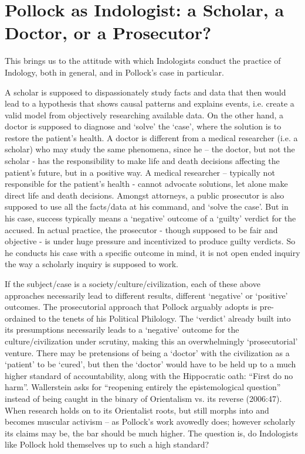 \section*{Pollock as Indologist: a Scholar, a Doctor, or a Prosecutor?}

This brings us to the attitude with which Indologists conduct the practice of Indology, both in general, and in Pollock’s case in particular.

A scholar is supposed to dispassionately study facts and data that then would lead to a hypothesis that shows causal patterns and explains events, i.e. create a valid model from objectively researching available data. On the other hand, a doctor is supposed to diagnose and ‘solve’ the ‘case’, where the solution is to restore the patient’s health. A doctor is different from a medical researcher (i.e. a scholar) who may study the same phenomena, since he – the doctor, but not the scholar - has the responsibility to make life and death decisions affecting the patient’s future, but in a positive way. A medical researcher – typically not responsible for the patient’s health - cannot advocate solutions, let alone make direct life and death decisions. Amongst attorneys, a public prosecutor is also supposed to use all the facts/data at his command, and ‘solve the case’. But in his case, success typically means a ‘negative’ outcome of a ‘guilty’ verdict for the accused. In actual practice, the prosecutor - though supposed to be fair and objective - is under huge pressure and incentivized to produce guilty verdicts. So he conducts his case with a specific outcome in mind, it is not open ended inquiry the way a scholarly inquiry is supposed to work.

If the subject/case is a society/culture/civilization, each of these above approaches necessarily lead to different results, different ‘negative’ or ‘positive’ outcomes. The prosecutorial approach that Pollock arguably adopts is pre-ordained to the tenets of his Political Philology. The ‘verdict’ already built into its presumptions necessarily leads to a ‘negative’ outcome for the culture/civilization under scrutiny, making this an overwhelmingly ‘prosecutorial’ venture. There may be pretensions of being a ‘doctor’ with the civilization as a ‘patient’ to be ‘cured’, but then the ‘doctor’ would have to be held up to a much higher standard of accountability, along with the Hippocratic oath: “First do no harm”. Wallerstein asks for “reopening entirely the epistemological question” instead of being caught in the binary of Orientalism vs. its reverse (2006:47). When research holds on to its Orientalist roots, but still morphs into and becomes muscular activism – as Pollock’s work avowedly does; however scholarly its claims may be, the bar should be much higher. The question is, do Indologists like Pollock hold themselves up to such a high standard?

